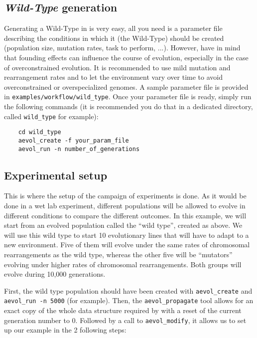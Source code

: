 \subsection{\emph{Wild-Type} generation}
Generating a Wild-Type in \aevol{} is very easy, all you need is a parameter file describing the conditions in which it (the Wild-Type) should be created (population size, mutation rates, task to perform, ...).
However, have in mind that founding effects can influence the course of evolution, especially in the case of overconstrained evolution. It is recommended to use mild mutation and rearrangement rates and to let the environment vary over time to avoid overconstrained or overspecialized genomes. A sample parameter file is provided in \verb?examples/workflow/wild_type?.
Once your parameter file is ready, simply run the following commands (it is recommended you do that in a dedicated directory, called \verb?wild_type? for example):

\begin{verbatim}
	cd wild_type
	aevol_create -f your_param_file
	aevol_run -n number_of_generations
\end{verbatim}



\subsection{Experimental setup}
This is where the setup of the campaign of experiments is done.
As it would be done in a wet lab experiment, different populations will be allowed to evolve in different conditions to compare the different outcomes. In this example, we will start from an evolved population called the ``wild type'', created as above. We will use this wild type to start 10 evolutionary lines that will have to adapt to a new environment. Five of them will evolve under the same rates of chromosomal rearrangements as the wild type, whereas the other five will be ``mutators'' evolving under higher rates of chromosomal rearrangements. Both groups will evolve during 10,000 generations.

First, the wild type population should have been created with \verb?aevol_create? and \\ \verb?aevol_run -n 5000? (for example). Then, the \verb?aevol_propagate? tool allows for an exact copy of the whole data structure required by \aevol{} with a reset of the current generation number to 0. Followed by a call to \verb?aevol_modify?, it allows us to set up our example in the 2 following steps:

